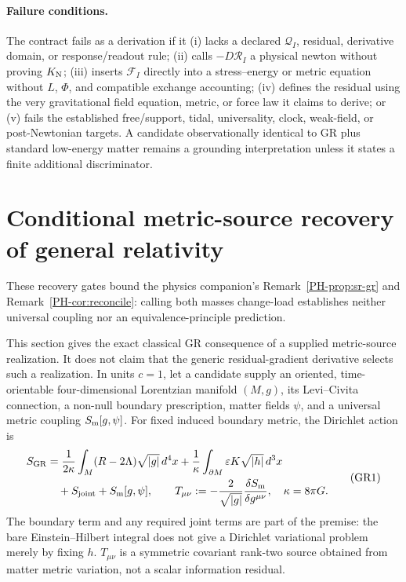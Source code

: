 \documentclass[11pt,a4paper]{article}
\theoremstyle{remark}
\begin{document}
\paragraph{Failure conditions.}
The contract fails as a derivation if it (i) lacks a declared $\mathcal Q_I$,
residual, derivative domain, or response/readout rule; (ii) calls
$-D\mathcal R_I$ a physical newton without proving $K_{\rm N}$; (iii) inserts
$\mathcal F_I$ directly into a stress--energy or metric equation without $L$,
$\Phi$, and compatible exchange accounting; (iv) defines the residual using the
very gravitational field equation, metric, or force law it claims to derive; or
(v) fails the established free/support, tidal, universality, clock, weak-field,
or post-Newtonian targets. A candidate observationally identical to GR plus
standard low-energy matter remains a grounding interpretation unless it states
a finite additional discriminator.

\section{Conditional metric-source recovery of general relativity}\label{sec:gr}
These recovery gates bound the physics companion's
Remark~\ref{PH-prop:sr-gr} and Remark~\ref{PH-cor:reconcile}:
calling both masses change-load establishes neither universal coupling nor
an equivalence-principle prediction.

This section gives the exact classical GR consequence of a supplied metric-source
realization. It does not claim that the generic residual-gradient derivative
selects such a realization. In units $c=1$, let a candidate supply an oriented,
time-orientable four-dimensional Lorentzian manifold $(M,g)$, its Levi--Civita
connection, a non-null boundary prescription, matter fields $\psi$, and a
universal metric coupling $S_{\rm m}[g,\psi]$. For fixed induced boundary metric,
the Dirichlet action is
\[
\begin{aligned}
 S_{\rm GR}&=\frac{1}{2\kappa}\int_M(R-2\Lambda)\sqrt{|g|}\,d^4x
 +\frac{1}{\kappa}\int_{\partial M}\varepsilon K\sqrt{|h|}\,d^3x\\
 &\quad+S_{\rm joint}+S_{\rm m}[g,\psi],
 \qquad
 T_{\mu\nu}:=-\frac{2}{\sqrt{|g|}}\frac{\delta S_{\rm m}}{\delta g^{\mu\nu}},
 \quad \kappa=8\pi G.
\end{aligned}\tag{GR1}
\]
The boundary term and any required joint terms are part of the premise: the bare
Einstein--Hilbert integral does not give a Dirichlet variational problem merely
by fixing $h$. $T_{\mu\nu}$ is a symmetric covariant rank-two source obtained
from matter metric variation, not a scalar information residual.
\end{document}
